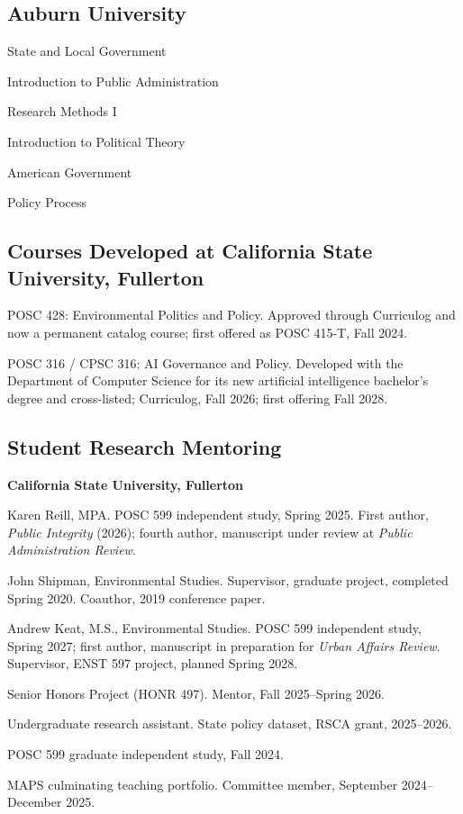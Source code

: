 \documentclass[11pt,letterpaper]{article}
\renewenvironment{itemize}{
  \begin{list}{}{
    \setlength{\leftmargin}{1.5em}
    \setlength{\itemsep}{0.25em}
    \setlength{\parskip}{0pt}
    \setlength{\parsep}{0.25em}
  }
}{
  \end{list}
}
\begin{document}
\subsection*{Auburn University}
\begin{itemize}\leftmargin=2pt\itemindent=-15pt
  \item State and Local Government
  \item Introduction to Public Administration
  \item Research Methods I
  \item Introduction to Political Theory
  \item American Government
  \item Policy Process
\end{itemize}

\subsection*{Courses Developed at California State University, Fullerton}
\begin{itemize}\leftmargin=2pt\itemindent=-15pt
  \item POSC 428: Environmental Politics and Policy. Approved through Curriculog and now a permanent catalog course; first offered as POSC 415-T, Fall 2024.
  \item POSC 316 / CPSC 316: AI Governance and Policy. Developed with the Department of Computer Science for its new artificial intelligence bachelor's degree and cross-listed; Curriculog, Fall 2026; first offering Fall 2028.
\end{itemize}

\subsection*{Student Research Mentoring}
\textbf{California State University, Fullerton}
\begin{itemize}\leftmargin=2pt\itemindent=-15pt
  \item Karen Reill, MPA. POSC 599 independent study, Spring 2025. First author, \emph{Public Integrity} (2026); fourth author, manuscript under review at \emph{Public Administration Review}.
  \item John Shipman, Environmental Studies. Supervisor, graduate project, completed Spring 2020. Coauthor, 2019 conference paper.
  \item Andrew Keat, M.S., Environmental Studies. POSC 599 independent study, Spring 2027; first author, manuscript in preparation for \emph{Urban Affairs Review}. Supervisor, ENST 597 project, planned Spring 2028.
  \item Senior Honors Project (HONR 497). Mentor, Fall 2025--Spring 2026.
  \item Undergraduate research assistant. State policy dataset, RSCA grant, 2025--2026.
  \item POSC 599 graduate independent study, Fall 2024.
  \item MAPS culminating teaching portfolio. Committee member, September 2024--December 2025.
\end{itemize}
\end{document}
